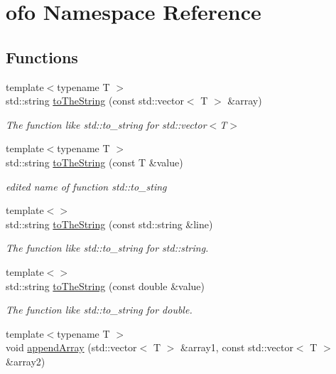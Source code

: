 \hypertarget{namespaceofo}{}\section{ofo Namespace Reference}
\label{namespaceofo}
\subsection*{Functions}
\begin{DoxyCompactItemize}
\item 
{\footnotesize template$<$typename T $>$ }\\std\+::string \mbox{\hyperlink{namespaceofo_a69e3fd282eb0698e75471037b3bf5c14}{to\+The\+String}} (const std\+::vector$<$ T $>$ \&array)
\begin{DoxyCompactList}\small\item\em The function like std\+::to\+\_\+string for std\+::vector$<$\+T$>$ \end{DoxyCompactList}\item 
{\footnotesize template$<$typename T $>$ }\\std\+::string \mbox{\hyperlink{namespaceofo_a2c6e4d8296036cbf1f27a0e785d203e1}{to\+The\+String}} (const T \&value)
\begin{DoxyCompactList}\small\item\em edited name of function std\+::to\+\_\+sting \end{DoxyCompactList}\item 
{\footnotesize template$<$$>$ }\\std\+::string \mbox{\hyperlink{namespaceofo_ac9cdba42766a85130c57eb07fd5bd5e5}{to\+The\+String}} (const std\+::string \&line)
\begin{DoxyCompactList}\small\item\em The function like std\+::to\+\_\+string for std\+::string. \end{DoxyCompactList}\item 
{\footnotesize template$<$$>$ }\\std\+::string \mbox{\hyperlink{namespaceofo_a7afe8b17c1060a8756bff591f3a6e163}{to\+The\+String}} (const double \&value)
\begin{DoxyCompactList}\small\item\em The function like std\+::to\+\_\+string for double. \end{DoxyCompactList}\item 
{\footnotesize template$<$typename T $>$ }\\void \mbox{\hyperlink{namespaceofo_af902ceadcbee96b115f72c248d935cd8}{append\+Array}} (std\+::vector$<$ T $>$ \&array1, const std\+::vector$<$ T $>$ \&array2)

\end{DoxyCompactItemize}
